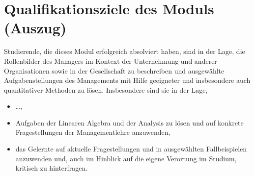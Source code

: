 \chapter*{Qualifikationsziele des Moduls (Auszug)}
Studierende, die dieses Modul erfolgreich absolviert haben, sind
in der Lage, die Rollenbilder des Managers im Kontext der
Unternehmung und anderer Organisationen sowie in der Gesellschaft
zu beschreiben und ausgew\"ahlte Aufgabenstellungen des
Managements mit Hilfe geeigneter und insbesondere auch
quantitativer Methoden zu l\"osen. Insbesondere sind sie in der
Lage,
%
\begin{itemize}
\item \ldots,
\item Aufgaben der Linearen Algebra und der Analysis zu l\"osen
und auf konkrete Fragestellungen der Managementlehre anzuwenden,
\item das Gelernte auf aktuelle Fragestellungen und in
ausgew\"ahlten Fallbeispielen anzuwenden und, auch im Hinblick
auf die eigene Verortung im Studium, kritisch zu hinterfragen.
\end{itemize}
%

